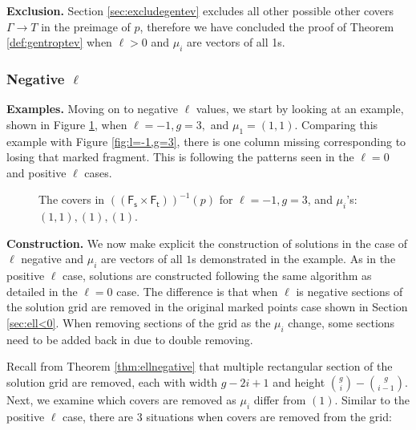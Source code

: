 \documentclass[11pt,reqno]{amsart}
\newcommand{\inputTikZ}[2]{%
     \resizebox{#1}{!}{}}
\theoremstyle{definition}
\newcommand{\Ft}{\mathsf{F_t}}
\newcommand{\Fs}{\mathsf{F_s}}
\begin{document}
    \noindent\textbf{Exclusion.}
    Section \ref{sec:excludegentev} excludes all other possible other covers $\Gamma\to T$ in the preimage of $p$, therefore we have concluded the proof of Theorem \ref{def:gentroptev} when $\ell>0$ and $\mu_i$ are vectors of all 1s. 

    \subsubsection*{Negative $\ell$}
    
    \vspace{0.5em}
    \noindent\textbf{Examples.}
     Moving on to negative $\ell$ values, we start by looking at an example, shown in Figure \ref{fig:ell=-1,g=3,(1,1)}, when $\ell=-1, g=3,$ and $\mu_1=(1,1).$ Comparing this example with Figure \ref{fig:l=-1,g=3}, there is one column missing corresponding to losing that marked fragment. This is following the patterns seen in the $\ell=0 $ and positive $\ell$ cases. 

     \begin{figure}[tb]
         \centering
         \inputTikZ{.3\textwidth}{Figures/ell=-1,g=3,_1,1_}
         \caption{The covers in $((\Fs \times \Ft))^{-1}(p)$ for $\ell=-1,g=3$, and $\mu_i$'s:$(1,1),(1),(1)$.}
         \label{fig:ell=-1,g=3,(1,1)}
     \end{figure}
    
    \vspace{0.5em}
    \noindent\textbf{Construction.}
We now make explicit the construction of solutions in the case of $\ell$ negative and $\mu_i$ are vectors of all $1$s demonstrated in the example. As in the positive $\ell$ case, solutions are constructed following the same algorithm as detailed in the $\ell=0$ case. The difference is that when $\ell$ is negative sections of the solution grid are removed in the original marked points case shown in Section \ref{sec:ell<0}. When removing sections of the grid as the $\mu_i$ change, some sections need to be added back in due to double removing. 

Recall from Theorem \ref{thm:ellnegative} that multiple rectangular section of the solution grid are removed, each with width $g-2i+1$ and height ${g\choose i} - {g\choose i-1}$. Next, we examine which covers are removed as $\mu_i$ differ from $(1)$. Similar to the positive $\ell$ case, there are $3$ situations when covers are removed from the grid:
\end{document}
